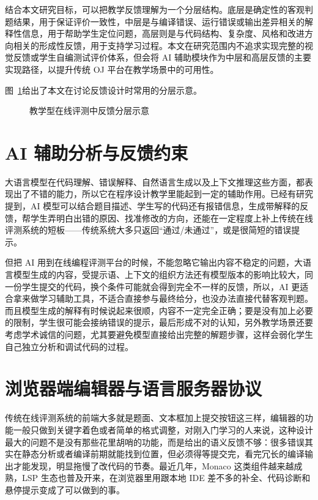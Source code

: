 结合本文研究目标，可以把教学反馈理解为一个分层结构。底层是确定性的客观判题结果，用于保证评价一致性，中层是与编译错误、运行错误或输出差异相关的解释性信息，用于帮助学生定位问题，高层则是与代码结构、复杂度、风格和改进方向相关的形成性反馈，用于支持学习过程。本文在研究范围内不追求实现完整的视觉反馈或学生自编测试评价体系，但会将 AI 辅助模块作为中层和高层反馈的主要实现路径，以提升传统 OJ 平台在教学场景中的可用性。

图~\ref{fig:ch2-feedback-stack}给出了本文在讨论反馈设计时常用的分层示意。

\begin{figure}[htbp]
  \centering
  \resizebox{0.88\textwidth}{!}{}
  \caption{教学型在线评测中反馈分层示意}
  \label{fig:ch2-feedback-stack}
\end{figure}

\section{AI 辅助分析与反馈约束}

大语言模型在代码理解、错误解释、自然语言生成以及上下文推理这些方面，都表现出了不错的能力，所以它在程序设计教学里能起到一定的辅助作用。已经有研究提到，AI 模型可以结合题目描述、学生写的代码还有报错信息，生成带解释的反馈，帮学生弄明白出错的原因、找准修改的方向，还能在一定程度上补上传统在线评测系统的短板——传统系统大多只返回“通过/未通过”，或是很简短的错误提示\cite{keuning2018feedback,sarsa2022llm,jacobs2024feedback}。

但把 AI 用到在线编程评测平台的时候，不能忽略它输出内容不稳定的问题，大语言模型生成的内容，受提示语、上下文的组织方法还有模型版本的影响比较大，同一份学生提交的代码，换个条件可能就会得到完全不一样的反馈，所以，AI 更适合拿来做学习辅助工具，不适合直接参与最终给分，也没办法直接代替客观判题。而且模型生成的解释有时候说起来很顺，内容不一定完全正确；要是没有加上必要的限制，学生很可能会接纳错误的提示，最后形成不对的认知，另外教学场景还要考虑学术诚信的问题，尤其要避免模型直接给出完整的解题步骤，这样会弱化学生自己独立分析和调试代码的过程。

\section{浏览器端编辑器与语言服务器协议}

传统在线评测系统的前端大多就是题面、文本框加上提交按钮这三样，编辑器的功能一般只做到关键字着色或者简单的格式调整，对刚入门学习的人来说，这种设计最大的问题不是没有那些花里胡哨的功能，而是给出的语义反馈不够：很多错误其实在静态分析或者编译前期就能找到位置，但必须得等提交完，看完冗长的编译输出才能发现，明显拖慢了改代码的节奏。最近几年，Monaco 这类组件越来越成熟，LSP 生态也普及开来，在浏览器里用跟本地 IDE 差不多的补全、代码诊断和悬停提示变成了可以做到的事\cite{monacoeditorrepo,lsp2024spec}。

